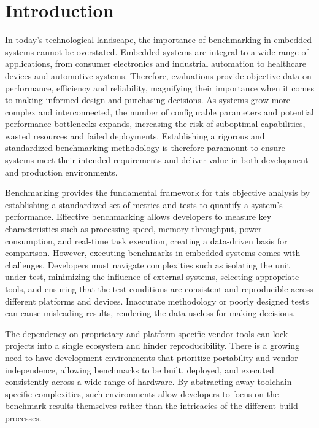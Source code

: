 \chapter*{Introduction}

In today's technological landscape, the importance of benchmarking in embedded systems cannot be overstated. Embedded systems are integral to a wide range of applications, from consumer electronics and industrial automation to healthcare devices and automotive systems. Therefore, evaluations provide objective data on performance, efficiency and reliability, magnifying their importance when it comes to making informed design and purchasing decisions. As systems grow more complex and interconnected, the number of configurable parameters and potential performance bottlenecks expands, increasing the risk of suboptimal capabilities, wasted resources and failed deployments. Establishing a rigorous and standardized benchmarking methodology is therefore paramount to ensure systems meet their intended requirements and deliver value in both development and production environments.

Benchmarking provides the fundamental framework for this objective analysis by establishing a standardized set of metrics and tests to quantify a system's performance. Effective benchmarking allows developers to measure key characteristics such as processing speed, memory throughput, power consumption, and real-time task execution, creating a data-driven basis for comparison. However, executing benchmarks in embedded systems comes with challenges. Developers must navigate complexities such as isolating the unit under test, minimizing the influence of external systems, selecting appropriate tools, and ensuring that the test conditions are consistent and reproducible across different platforms and devices. Inaccurate methodology or poorly designed tests can cause misleading results, rendering the data useless for making decisions.

The dependency on proprietary and platform-specific vendor tools can lock projects into a single ecosystem and hinder reproducibility. There is a growing need to have development environments that prioritize portability and vendor independence, allowing benchmarks to be built, deployed, and executed consistently across a wide range of hardware. By abstracting away toolchain-specific complexities, such environments allow developers to focus on the benchmark results themselves rather than the intricacies of the different build processes.

